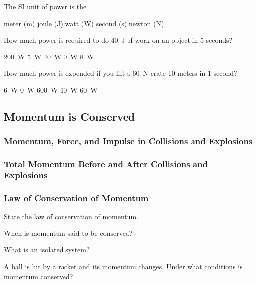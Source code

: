 \documentclass[../main-physics-problems.tex]{subfiles}
\begin{document}
\begin{questions}
\question
The SI unit of power is the \fillin\ .

\begin{randomizechoices}
\choice meter (m)
\choice joule (J)
\correctchoice watt (W)
\choice second (s)
\choice newton (N)
\end{randomizechoices}


\question
How much power is required to do \SI{40}{J} of work on an object in 5 seconds?

\begin{randomizechoices}
\choice \SI{200}{W}
\choice \SI{5}{W}
\choice \SI{40}{W}
\choice \SI{0}{W}
\correctchoice \SI{8}{W}
\end{randomizechoices}

\question
How much power is expended if you lift a \SI{60}{N} crate 10 meters in 1 second?

\begin{randomizechoices}
\choice \SI{6}{W}
\choice \SI{0}{W}
\correctchoice \SI{600}{W}
\choice \SI{10}{W}
\choice \SI{60}{W}
\end{randomizechoices}
\end{questions}

\clearpage

\subsection{Momentum is Conserved}

\subsubsection{Momentum, Force, and Impulse in Collisions and Explosions}

\subsubsection{Total Momentum Before and After Collisions and Explosions}

\subsubsection{Law of Conservation of Momentum}

\begin{questions}
\question
State the law of conservation of momentum.


\question
When is momentum said to be conserved?


\question
What is an isolated system?


\question
A ball is hit by a racket and its momentum changes. Under what conditions is momentum conserved?
\end{questions}
\end{document}
